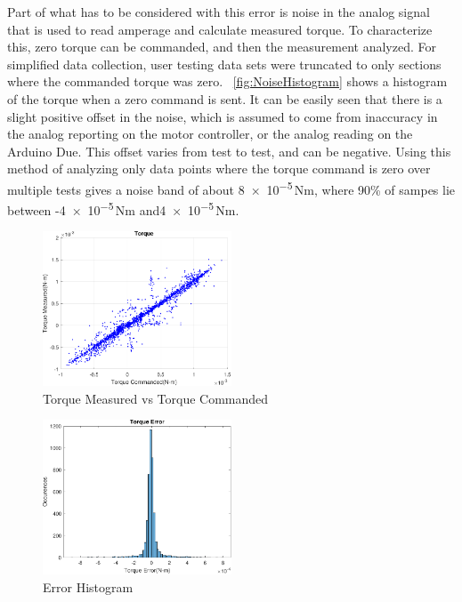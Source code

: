 \documentclass[11pt, letterpaper]{article}
\begin{document}
\begin{itemize}
Part of what has to be considered with this error is noise in the analog signal that is used to read amperage and calculate measured torque.
To characterize this, zero torque can be commanded, and then the measurement analyzed.  
For simplified data collection, user testing data sets were truncated to only sections where the commanded torque was zero.
\figurename~\ref{fig:NoiseHistogram} shows a histogram of the torque when a zero command is sent.
It can be easily seen that there is a slight positive offset in the noise, which is assumed to come from inaccuracy in the analog reporting on the motor controller, or the analog reading on the Arduino Due.
This offset varies from test to test, and can be negative.
Using this method of analyzing only data points where the torque command is zero over multiple tests gives a noise band of about \num{8e-5}\,Nm, where 90\% of sampes lie between -\num{4e-5}\,Nm and\num{4e-5}\,Nm.

\begin{figure}[tb]
  \centering
  \includegraphics[width=0.5\textwidth]{diagrams/TorqueCommanded.pdf}
  \caption{Torque Measured vs Torque Commanded}
  \label{fig:TorqueCommanded}
\end{figure}

\begin{figure}[tb]
  \centering
  \includegraphics[width=0.5\textwidth]{diagrams/ErrorHistogram.pdf}
  \caption{Error Histogram}
  \label{fig:ErrorHistogram}
\end{figure}


\end{itemize}
\end{document}
